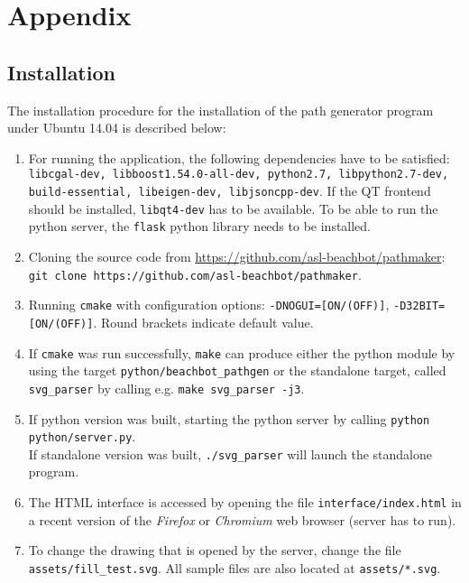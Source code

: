 \chapter{Appendix}
\label{sec:appendix}
\section{Installation}

The installation procedure for the installation of the path generator program under Ubuntu 14.04 is described below:

\begin{enumerate}
\item For running the application, the following dependencies have to be satisfied:
\texttt{libcgal-dev, libboost1.54.0-all-dev, python2.7, libpython2.7-dev, build-essential, libeigen-dev, libjsoncpp-dev}. If the QT frontend should be installed, \texttt{libqt4-dev} has to be available. To be able to run the python server, the \texttt{flask} python library needs to be installed.
\item Cloning the source code from \url{https://github.com/asl-beachbot/pathmaker}: \texttt{git clone https://github.com/asl-beachbot/pathmaker}.
\item Running \texttt{cmake} with configuration options: \texttt{-DNOGUI=[ON/(OFF)]}, \texttt{-D32BIT=[ON/(OFF)]}. Round brackets indicate default value.
\item If \texttt{cmake} was run successfully, \texttt{make} can produce either the python module by using the target \texttt{python/beachbot\_pathgen} or the standalone target, called \texttt{svg\_parser} by calling e.g. \texttt{make svg\_parser -j3}.
\item If python version was built, starting the python server by calling \texttt{python python/server.py}.\\
If standalone version was built, \texttt{./svg\_parser} will launch the standalone program.
\item The HTML interface is accessed by opening the file \texttt{interface/index.html} in a recent version of the \textit{Firefox} or \textit{Chromium} web browser (server has to run).
\item To change the drawing that is opened by the server, change the file \texttt{assets/fill\_test.svg}. All sample files are also located at \texttt{assets/*.svg}.
\end{enumerate}
\newpage
